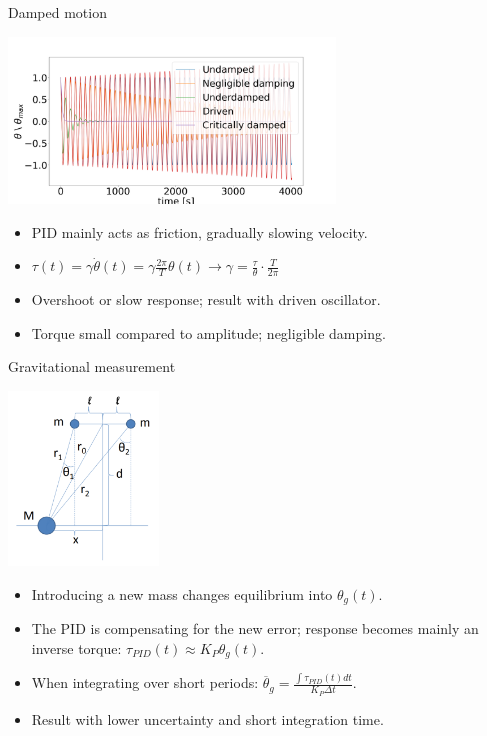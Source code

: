 \documentclass{beamer}
\begin{document}

\begin{frame}{Damped motion}
	\begin{center}		
		\includegraphics[width=0.65\textwidth,keepaspectratio]{underdamp.png}
	\end{center}
	\begin{itemize}		
		\item PID mainly acts as friction, gradually slowing velocity.
		\item $\tau(t) =  \gamma\dot{\theta}(t) =  \gamma\frac{2\pi}{T} \theta( t) \rightarrow \gamma  =\frac{\tau}{\theta}\cdot \frac{ T}{2\pi} $
		\item Overshoot or slow response; result with driven oscillator.
		\item Torque small compared to amplitude; negligible damping. 
		
	\end{itemize}
\end{frame}

\begin{frame}{\hypertarget{frame:Gravimetric measurement}{Gravitational measurement}}
	\begin{center}		
		\includegraphics[width=0.3\textwidth,keepaspectratio]{Cavendish apparatus.PNG}
    \end{center}
	\begin{itemize}
		
		\item Introducing a new mass changes equilibrium into $\theta_g(t)$. 
		\item The PID is compensating for the new error; response becomes mainly an inverse torque: $\tau_{PID}(t) \approx K_P\theta_g(t)$. 
		\item When integrating over short periods: $\overline{\theta}_g =  \frac{\int \tau_{PID}(t) dt}{ K_P \Delta t} $. 	
		\item Result with lower uncertainty and short integration time.
	\end{itemize}
\end{frame}
\end{document}
